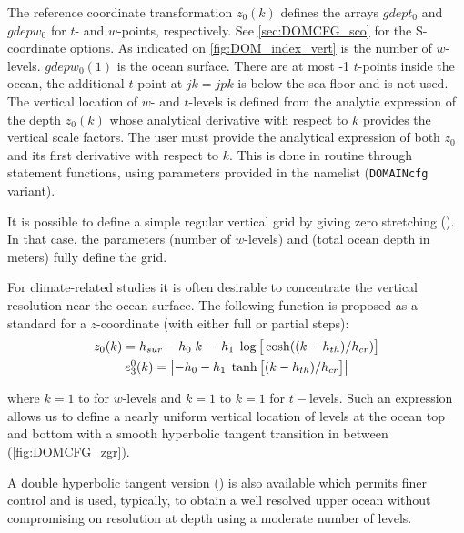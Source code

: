 \documentclass[../main/NEMO_manual]{subfiles}
\begin{document}
The reference coordinate transformation $z_0(k)$ defines the arrays $gdept_0$ and
$gdepw_0$ for $t$- and $w$-points, respectively. See \autoref{sec:DOMCFG_sco} for the
S-coordinate options.  As indicated on \autoref{fig:DOM_index_vert}  is the number of
$w$-levels.  $gdepw_0(1)$ is the ocean surface.  There are at most -1 $t$-points
inside the ocean, the additional $t$-point at $jk = jpk$ is below the sea floor and is not
used.  The vertical location of $w$- and $t$-levels is defined from the analytic
expression of the depth $z_0(k)$ whose analytical derivative with respect to $k$ provides
the vertical scale factors.  The user must provide the analytical expression of both $z_0$
and its first derivative with respect to $k$.  This is done in routine 
through statement functions, using parameters provided in the  namelist
(\texttt{DOMAINcfg} variant).

It is possible to define a simple regular vertical grid by giving zero stretching
().  In that case, the parameters  (number of $w$-levels)
and  (total ocean depth in meters) fully define the grid.

For climate-related studies it is often desirable to concentrate the vertical resolution
near the ocean surface.  The following function is proposed as a standard for a
$z$-coordinate (with either full or partial steps):
\begin{gather}
  \label{eq:DOMCFG_zgr_ana_1}
    z_0  (k) = h_{sur} - h_0 \; k - \; h_1 \; \log  \big[ \cosh ((k - h_{th}) / h_{cr}) \big] \\
    e_3^0(k) = \left|    - h_0      -    h_1 \; \tanh \big[        (k - h_{th}) / h_{cr}  \big] \right|
\end{gather}

where $k = 1$ to  for $w$-levels and $k = 1$ to $k = 1$ for $t-$levels.  Such an
expression allows us to define a nearly uniform vertical location of levels at the ocean
top and bottom with a smooth hyperbolic tangent transition in between (\autoref{fig:DOMCFG_zgr}).

A double hyperbolic tangent version () is also available
which permits finer control and is used, typically, to obtain a well resolved upper ocean
without compromising on resolution at depth using a moderate number of levels.
\end{document}
